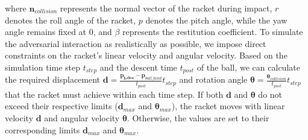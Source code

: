 where $\bm{n}_{collision}$ represents the normal vector of the racket during impact, $r$ denotes the roll angle of the racket, $p$ denotes the pitch angle, while the yaw angle remains fixed at 0, and $\beta$ represents the restitution coefficient. To simulate the adversarial interaction as realistically as possible, we impose direct constraints on the racket’s linear velocity and angular velocity. Based on the simulation time step $t_{step}$ and the descent time $t_{post}$ of the ball, we can calculate the required displacement $\boldsymbol{d} = \frac{\boldsymbol{p_b{}_{des}}-\bm{p}_{ball\_land}}{t_{post}}t_{step}$ and rotation angle $\boldsymbol{\theta} = \frac{\bm{\theta}_{collision}}{t_{post}}t_{step}$ that the racket must achieve within each time step. If both $\boldsymbol{d}$ and $\boldsymbol{\theta}$ do not exceed their respective limits ($\boldsymbol{d}_{max}$ and $\boldsymbol{\theta}_{max}$), the racket moves with linear velocity $\boldsymbol{d}$ and angular velocity $\boldsymbol{\theta}$. Otherwise, the values are set to their corresponding limits $\boldsymbol{d}_{max}$ and $\boldsymbol{\theta}_{max}$.
